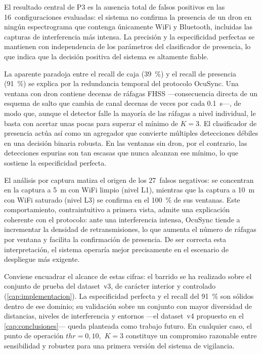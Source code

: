 El resultado central de P3 es la ausencia total de falsos positivos en las \num{16}~configuraciones evaluadas: el sistema no confirma la presencia de un dron en ningún espectrograma que contenga únicamente WiFi y Bluetooth, incluidas las capturas de interferencia más intensa. La precisión y la especificidad perfectas se mantienen con independencia de los parámetros del clasificador de presencia, lo que indica que la decisión positiva del sistema es altamente fiable.


La aparente paradoja entre el recall de caja (\SI{39}{\percent}) y el recall de presencia (\SI{91}{\percent}) se explica por la redundancia temporal del protocolo OcuSync. Una ventana con dron contiene decenas de ráfagas FHSS ---consecuencia directa de un esquema de salto que cambia de canal decenas de veces por cada \SI{0.1}{\second}---, de modo que, aunque el detector falle la mayoría de las ráfagas a nivel individual, le basta con acertar unas pocas para superar el mínimo de $K=3$. El clasificador de presencia actúa así como un agregador que convierte múltiples detecciones débiles en una decisión binaria robusta. En las ventanas sin dron, por el contrario, las detecciones espurias son tan escasas que nunca alcanzan ese mínimo, lo que sostiene la especificidad perfecta.


El análisis por captura matiza el origen de los \num{27}~falsos negativos: se concentran en la captura a \SI{5}{\meter} con WiFi limpio (nivel L1), mientras que la captura a \SI{10}{\meter} con WiFi saturado (nivel L3) se confirma en el \SI{100}{\percent} de sus ventanas. Este comportamiento, contraintuitivo a primera vista, admite una explicación coherente con el protocolo: ante una interferencia intensa, OcuSync tiende a incrementar la densidad de retransmisiones, lo que aumenta el número de ráfagas por ventana y facilita la confirmación de presencia. De ser correcta esta interpretación, el sistema operaría mejor precisamente en el escenario de despliegue más exigente.


Conviene encuadrar el alcance de estas cifras: el barrido se ha realizado sobre el conjunto de prueba del dataset~v3, de carácter interior y controlado (\cref{cap:implementacion}). La especificidad perfecta y el recall del \SI{91}{\percent} son sólidos dentro de ese dominio; su validación sobre un conjunto con mayor diversidad de distancias, niveles de interferencia y entornos ---el dataset~v4 propuesto en el \cref{cap:conclusiones}--- queda planteada como trabajo futuro. En cualquier caso, el punto de operación $\mathit{thr}=0{,}10$,\, $K=3$ constituye un compromiso razonable entre sensibilidad y robustez para una primera versión del sistema de vigilancia.


